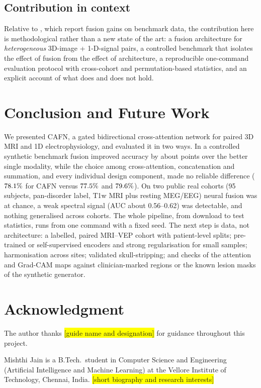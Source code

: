 \documentclass{ieeeaccessapprox}
\newcommand{\todo}[1]{\colorbox{yellow}{[#1]}}
\begin{document}
\subsection{Contribution in context}
Relative to \cite{zhou2024camf,dhar2025drifa}, which report fusion gains on benchmark data, the contribution here is methodological rather than a new state of the art: a fusion architecture for \emph{heterogeneous} 3D-image + 1-D-signal pairs, a controlled benchmark that isolates the effect of fusion from the effect of architecture, a reproducible one-command evaluation protocol with cross-cohort and permutation-based statistics, and an explicit account of what does and does not hold.

\section{Conclusion and Future Work}\label{sec:conclusion}
We presented CAFN, a gated bidirectional cross-attention network for paired 3D MRI and 1D electrophysiology, and evaluated it in two ways. In a controlled synthetic benchmark fusion improved accuracy by about \gainUni{} points over the better single modality, while the choice among cross-attention, concatenation and summation, and every individual design component, made no reliable difference ($78.1\%$ for CAFN versus $77.5\%$ and $79.6\%$). On two public real cohorts (95 subjects, pan-disorder label, T1w MRI plus resting MEG/EEG) neural fusion was at chance, a weak spectral signal (AUC about 0.56--0.62) was detectable, and nothing generalised across cohorts. The whole pipeline, from download to test statistics, runs from one command with a fixed seed. The next step is data, not architecture: a labelled, paired MRI--VEP cohort with patient-level splits; pre-trained or self-supervised encoders and strong regularisation for small samples; harmonisation across sites; validated skull-stripping; and checks of the attention and Grad-CAM maps against clinician-marked regions or the known lesion masks of the synthetic generator.

\section*{Acknowledgment}
The author thanks \todo{guide name and designation} for guidance throughout this project.



\begin{biography}{}{Mishthi Jain}
is a B.Tech.\ student in Computer Science and Engineering (Artificial Intelligence and Machine Learning) at the Vellore Institute of Technology, Chennai, India. \todo{short biography and research interests}
\end{biography}
\EOD
\end{document}
